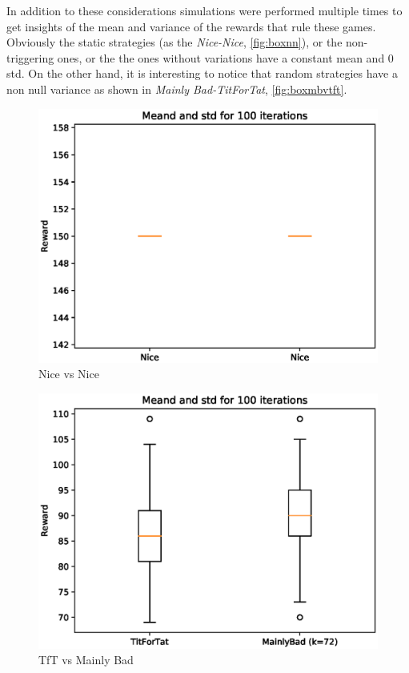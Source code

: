 \documentclass[journal,a4paper,10pt,twoside]{IEEEtran} %
\begin{document}
In addition to these considerations simulations were performed multiple times to get insights of the mean and variance of the rewards that rule these games. Obviously the static strategies (as the \textit{Nice-Nice}, \autoref{fig:boxnn}), or the non-triggering ones, or the the ones without variations have a constant mean and $0$ std. On the other hand, it is interesting to notice that random strategies have a non null variance as shown in \textit{Mainly Bad-TitForTat}, \autoref{fig:boxmbvtft}.

\begin{figure}[!ht]
    \centering
    \includegraphics[width=1\columnwidth]{../img/ipd2p/ipd2p-boxplot-Nice-Nice}
    \caption{Nice vs Nice}
    \label{fig:boxnn}
\end{figure}

\begin{figure}[!ht]
    \centering
    \includegraphics[width=1\columnwidth]{../img/ipd2p/ipd2p-boxplot-TitForTat-MainlyBad(k=72)}
    \caption{TfT vs Mainly Bad}
    \label{fig:boxmbvtft}
\end{figure}
\end{document}
